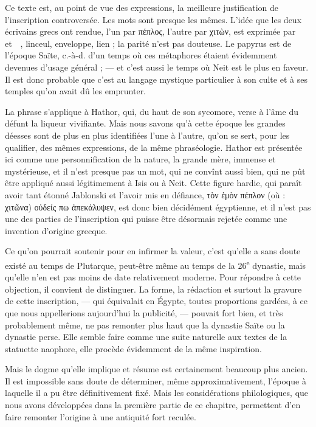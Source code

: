 \documentclass[letterpaper,twocolumn,openany,nodeprecatedcode]{dndbook}
\newcommand*\hieroAAAH{}
\newcommand*\hieroAACM{}
\newcommand*\hieroAACS{}
\newcommand*\hieroAAEZ{}
\newcommand*\hieroAAFZ{\raisebox{0.5ex}{}}
\newcommand*\hieroAAHX{}
\newcommand*\hieroABIE{}
\newcommand*\hieroABIF{}
\begin{document}
Ce texte est, au point de vue des expressions, la meilleure justification de l'inscription controversée. Les mots sont presque les mêmes. L'idée que les deux écrivains grecs ont rendue, l'un par πέπλος, l'autre par χιτὼν, est exprimée par $\hieroABIE\:\hieroAAAH\allowbreak\:\hieroAACS\:\hieroAAFZ$ et $\hieroAAHX\:\hieroAAEZ\allowbreak\:\hieroAACM\:\hieroABIF$, linceul, enveloppe, lien ; la parité n'est pas douteuse. Le papyrus est de l'époque Saïte, c.-à-d. d'un temps où ces métaphores étaient évidemment devenues d'usage général ; --- et c'est aussi le temps où Neit est le plus en faveur. Il est donc probable que c'est au langage mystique particulier à son culte et à ses temples qu'on avait dû les emprunter.

La phrase s'applique à Hathor, qui, du haut de son sycomore, verse à l'âme du défunt la liqueur vivifiante. Mais nous savons qu'à cette époque les grandes déesses sont de plus en plus identifiées l'une à l'autre, qu'on se sert, pour les qualifier, des mêmes expressions, de la même phraséologie. Hathor est présentée ici comme une personnification de la nature, la grande mère, immense et mystérieuse, et il n'est presque pas un mot, qui ne convînt aussi bien, qui ne pût être appliqué aussi légitimement à Isis ou à Neit. Cette figure hardie, qui paraît avoir tant étonné Jablonski et l'avoir mis en défiance, τὸν ἑμὸν πέπλον (où : χιτῶνα) οὐδείς πω ἀπεκάλυψεν, est donc bien décidément égyptienne, et il n'est pas une des parties de l'inscription qui puisse être désormais rejetée comme une invention d'origine grecque.

Ce qu'on pourrait soutenir pour en infirmer la valeur, c'est qu'elle a sans doute existé au temps de Plutarque, peut-être même au temps de la 26\textsuperscript{e} dynastie, mais qu'elle n'en est pas moins de date relativement moderne. Pour répondre à cette objection, il convient de distinguer. La forme, la rédaction et surtout la gravure de cette inscription, --- qui équivalait en Égypte, toutes proportions gardées, à ce que nous appellerions aujourd'hui la publicité, --- pouvait fort bien, et très probablement même, ne pas remonter plus haut que la dynastie Saïte ou la dynastie perse. Elle semble faire comme une suite naturelle aux textes de la statuette naophore, elle procède évidemment de la même inspiration.

Mais le dogme qu'elle implique et résume est certainement beaucoup plus ancien. Il est impossible sans doute de déterminer, même approximativement, l'époque à laquelle il a pu être définitivement fixé. Mais les considérations philologiques, que nous avons développées dans la première partie de ce chapitre, permettent d'en faire remonter l'origine à une antiquité fort reculée.
\end{document}
